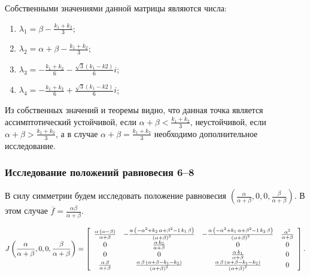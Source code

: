 \documentclass[12pt]{article}
\theoremstyle{rusdef}
\begin{document}
	Собственными значениями данной матрицы являются числа:
	\begin{enumerate}
	\item
	$\lambda_1 = \beta - \frac{k_1 + k_2}{3}$;
	\item
	$\lambda_2 = \alpha + \beta - \frac{k_1 + k_2}{3}$;
	\item
	$\lambda_3 = -\frac{k_1+k_2}{6} - \frac{\sqrt{3}(k_1-k2)}{6}i$;
	\item
	$\lambda_4 = -\frac{k_1+k_2}{6} + \frac{\sqrt{3}(k_1-k2)}{6}i$;
	\end{enumerate}
	
	Из собственных значений и теоремы видно, что данная точка является ассимптотический устойчивой, если $\alpha + \beta < \frac{k_1+k_2}{3}$, неустойчивой, если $\alpha + \beta > \frac{k_1+k_2}{3}$, а в случае $\alpha + \beta = \frac{k_1+k_2}{3}$ необходимо дополнительное исследование.
	
	\subsubsection{Исследование положений равновесия 6--8}
	
	В силу симметрии будем исследовать положение равновесия $\left( \frac{\alpha}{\alpha+\beta}, 0, 0, \frac{\beta}{\alpha+\beta} \right)$. В этом случае $\overline{f} = \frac{\alpha\beta}{\alpha+\beta}$.

	\begin{gather}
	J\left( \frac{\alpha}{\alpha+\beta}, 0, 0, \frac{\beta}{\alpha+\beta} \right) = \left[
\begin{array}{cccc} \frac{\alpha\, \left(\alpha - \beta\right)}{\alpha + \beta} & -\frac{\alpha\, \left( - {\alpha}^2 + k_{2}\, \alpha + {\beta}^2 - 1\, k_{1}\, \beta\right)}{{\left(\alpha + \beta\right)}^2} & -\frac{\alpha\, \left( - {\alpha}^2 + k_{1}\, \alpha + {\beta}^2 - 1\, k_{2}\, \beta\right)}{{\left(\alpha + \beta\right)}^2} & \frac{{\alpha}^2}{\alpha + \beta}\\ 0 & \frac{\alpha\, k_{2}}{\alpha + \beta} & 0 & 0\\ 0 & 0 & \frac{\alpha\, k_{1}}{\alpha + \beta} & 0\\ \frac{\alpha\, \beta}{\alpha + \beta} & \frac{\alpha\, \beta\, \left(\alpha + \beta - k_{1} - k_{2}\right)}{{\left(\alpha + \beta\right)}^2} & \frac{\alpha\, \beta\, \left(\alpha + \beta - k_{1} - k_{2}\right)}{{\left(\alpha + \beta\right)}^2} & 0 \end{array}
	\right]. \notag
	\end{gather}
	
\end{document}
